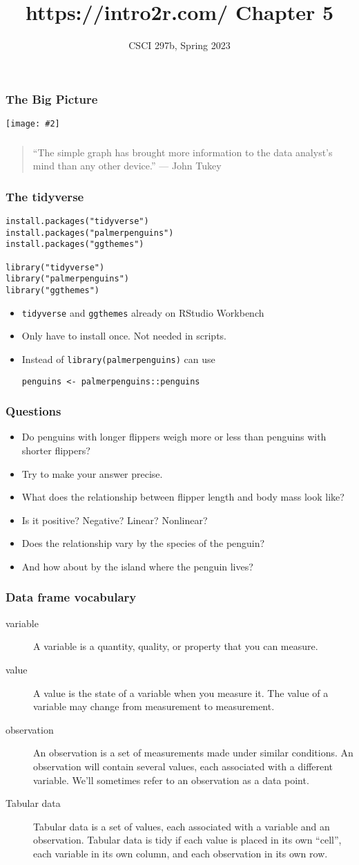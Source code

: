 \documentclass{beamer}
\title{{https://intro2r.com/} Chapter 5}
\author{CSCI 297b, Spring 2023}
\newcommand{\bi}{\begin{itemize}}
\newcommand{\li}{\item}
\newcommand{\ei}{\end{itemize}}
\newcommand{\fig}[2]{\centerline{\texttt{[image: \#2]}}}
\newcommand{\bfr}[1]{\begin{frame}[fragile]\frametitle{{ #1 }}}
\begin{document}
\begin{frame}
\maketitle
\end{frame}

\bfr{The Big Picture}
\fig{1}{whole-game.png}
\end{frame}

\bfr{}
\begin{quotation}

“The simple graph has brought more information to the data analyst’s mind than any other device.” — John Tukey
\end{quotation}
\end{frame}

\bfr{The tidyverse}
\begin{verbatim}
install.packages("tidyverse")
install.packages("palmerpenguins")
install.packages("ggthemes")

library("tidyverse")
library("palmerpenguins")
library("ggthemes")
\end{verbatim}
\bi
\li {\tt tidyverse} and {\tt ggthemes} already on RStudio Workbench
\li Only have to install once.  Not needed in scripts.
\li Instead of  {\tt library(palmerpenguins)} can use
\begin{verbatim}
penguins <- palmerpenguins::penguins
\end{verbatim}
\ei
\end{frame}

\bfr{Questions}
\bi
\li Do penguins with longer flippers weigh more or less than penguins with 
shorter flippers? 
\li Try to make your answer precise. 
\li What does the relationship between flipper length and body mass look like? 
\li Is it positive? Negative? Linear? Nonlinear? 
\li Does the relationship vary by the species of the penguin? 
\li And how about by the island where the penguin lives? 
\ei
\end{frame}

\bfr{Data frame vocabulary}
\begin{description}
\li[variable] A variable is a quantity, quality, or property that you can measure.

\li[value]
A value is the state of a variable when you measure it. The value of a variable may change from measurement to measurement.

\li[observation]
An observation is a set of measurements made under similar conditions. An observation will contain several values, each associated with a different variable. We’ll sometimes refer to an observation as a data point.

\li[Tabular data]
Tabular data is a set of values, each associated with a variable and an observation. Tabular data is tidy if each value is placed in its own “cell”, each variable in its own column, and each observation in its own row.
\end{description}
\end{frame}
\end{document}
